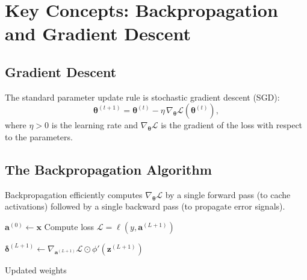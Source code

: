 \documentclass[12pt,a4paper]{article}
\begin{document}
\section{Key Concepts: Backpropagation and Gradient Descent}
\label{sec:backprop}

\subsection{Gradient Descent}
\label{subsec:gd}

The standard parameter update rule is stochastic gradient descent (SGD):
\begin{equation}
  \label{eq:sgd}
  \boldsymbol{\theta}^{(t+1)}
  = \boldsymbol{\theta}^{(t)}
  - \eta \, \nabla_{\boldsymbol{\theta}} \mathcal{L}\!\left(\boldsymbol{\theta}^{(t)}\right),
\end{equation}
where $\eta > 0$ is the learning rate and $\nabla_{\boldsymbol{\theta}}
\mathcal{L}$ is the gradient of the loss with respect to the parameters.

\subsection{The Backpropagation Algorithm}
\label{subsec:bp_algo}

Backpropagation efficiently computes $\nabla_{\boldsymbol{\theta}} \mathcal{L}$
by a single forward pass (to cache activations) followed by a single backward
pass (to propagate error signals).

\begin{algorithm}[H]
\caption{Backpropagation for a fully-connected network}
\label{alg:backprop}
\SetAlgoLined
{}

\BlankLine
{}
$\mathbf{a}^{(0)} \leftarrow \mathbf{x}$\;
Compute loss $\mathcal{L} = \ell(y, \mathbf{a}^{(L+1)})$\;

\BlankLine
{}
$\boldsymbol{\delta}^{(L+1)} \leftarrow \nabla_{\mathbf{a}^{(L+1)}}\mathcal{L}
                                \odot \phi'(\mathbf{z}^{(L+1)})$\;

\BlankLine
{}
\Return Updated weights\;
\end{algorithm}
\end{document}
